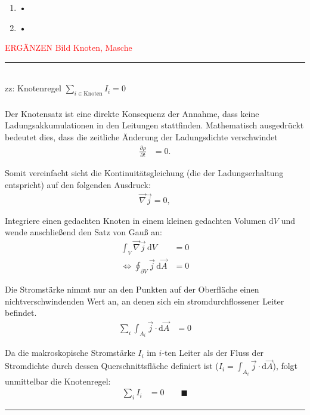 \documentclass{article}
\newcommand{\diff}{\mathrm{d}}
\begin{document}
	\begin{enumerate}
		\item \textbf{•}
	
	
		\item \textbf{•}
	\end{enumerate}

\textcolor{red}{ERGÄNZEN Bild Knoten, Masche}

\newpage


{\color{violet}
\hrule
	\\
	zz: Knotenregel $\sum_{i \in \text{Knoten}} I_i = 0$ \\
	\\
	Der Knotensatz ist eine direkte Konsequenz der Annahme, dass keine Ladungsakkumulationen in den Leitungen stattfinden. Mathematisch ausgedrückt bedeutet dies, dass die zeitliche Änderung der Ladungsdichte verschwindet
		\begin{align*}
			\frac{\partial \rho}{\partial t} &= 0.
		\end{align*}
	
	
	Somit vereinfacht sicht die Kontinuitätsgleichung (die der Ladungserhaltung entspricht) auf den folgenden Ausdruck:
		\begin{align*}
			\vec{\nabla} \vec{j} = 0,
		\end{align*}
	
	Integriere einen gedachten Knoten in einem kleinen gedachten Volumen $\diff V$ und wende anschließend den Satz von Gauß an:
		\begin{align*}
			\int_V \vec{\nabla} \vec{j} \, \diff V &= 0 \\
			\Leftrightarrow \oint_{\partial V} \vec{j} \, \diff \vec{A} &= 0
		\end{align*}
	
		Die Stromstärke nimmt nur an den Punkten auf der Oberfläche einen nichtverschwindenden Wert an, an denen sich ein stromdurchflossener Leiter befindet.
		\begin{align*}
			\sum_i \int_{A_i} \vec{j} \cdot \diff \vec{A} &= 0
		\end{align*}
	
	Da die makroskopische Stromstärke $I_i$ im $i$-ten Leiter als der Fluss der Stromdichte durch dessen Querschnittsfläche definiert ist ($I_i = \int_{A_i} \vec{j} \cdot \diff \vec{A}$), folgt unmittelbar die Knotenregel:
		\begin{align*}
			\sum_i I_i &= 0 \qquad \blacksquare
		\end{align*}
\hrule
}
\end{document}
